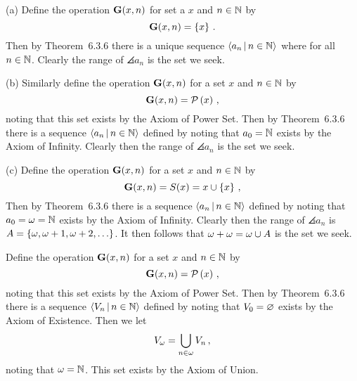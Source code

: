 \begin{solution}
	(a) Define the operation $\mathbf{G}(x,n)$ for set a $x$ and $n \in \mathbb{N}$ by
    $$
    \mathbf{G}(x,n) = \left\{ x \right\} \,.
    $$
    Then by Theorem~6.3.6 there is a unique sequence $\left\langle a_n \,|\, n \in \mathbb{N} \right\rangle$ where
    for all $n \in \mathbb{N}$.
    Clearly the range of $\angles{a_n}$ is the set we seek. \qedsymbol

    (b) Similarly define the operation $\mathbf{G}(x,n)$ for a set $x$ and $n \in \mathbb{N}$ by
    $$
    \mathbf{G}(x,n) = \mathcal{P}\left(x\right) \,,
    $$
    noting that this set exists by the Axiom of Power Set.
    Then by Theorem~6.3.6 there is a sequence $\left\langle a_n \,|\, n \in \mathbb{N} \right\rangle$ defined by
    noting that $a_0 = \mathbb{N}$ exists by the Axiom of Infinity.
    Clearly then the range of $\angles{a_n}$ is the set we seek. \qedsymbol

    (c) Define the operation $\mathbf{G}(x,n)$ for a set $x$ and $n \in \mathbb{N}$ by
    $$
    \mathbf{G}(x,n) = S(x) = x \cup \left\{ x \right\} \,,
    $$
    Then by Theorem~6.3.6 there is a sequence $\left\langle a_n \,|\, n \in \mathbb{N} \right\rangle$ defined by
    noting that $a_0 = \omega = \mathbb{N}$ exists by the Axiom of Infinity.
    Clearly then the range of $\angles{a_n}$ is $A = \left\{ \omega, \omega+1, \omega+2, \ldots \right\}$.
    It then follows that  $\omega + \omega = \omega \cup A$ is the set we seek. \qedsymbol
\end{solution}


\begin{solution}
    Define the operation $\mathbf{G}(x,n)$ for a set $x$ and $n \in \mathbb{N}$ by
    $$
    \mathbf{G}(x,n) = \mathcal{P}\left(x\right) \,,
    $$
    noting that this set exists by the Axiom of Power Set.
    Then by Theorem~6.3.6 there is a sequence $\left\langle V_n \,|\, n \in \mathbb{N} \right\rangle$ defined by
    noting that $V_0 = \varnothing$ exists by the Axiom of Existence.
    Then we let
    $$
    V_\omega = \bigcup_{n \in \omega} V_n \,,
    $$
    noting that $\omega = \mathbb{N}$.
    This set exists by the Axiom of Union. \qedsymbol
\end{solution}

